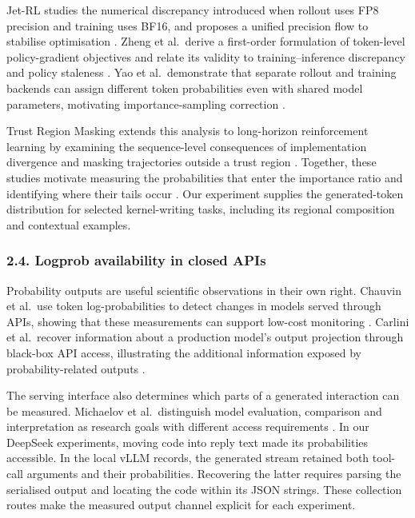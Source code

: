 \documentclass[
  11pt,
]{article}
\begin{document}
Jet-RL studies the numerical discrepancy introduced when rollout uses
FP8 precision and training uses BF16, and proposes a unified precision
flow to stabilise optimisation \citep{jetrl}. Zheng et al.~derive a
first-order formulation of token-level policy-gradient objectives and
relate its validity to training--inference discrepancy and policy
staleness \citep{firstorder}. Yao et al.~demonstrate that separate
rollout and training backends can assign different token probabilities
even with shared model parameters, motivating importance-sampling
correction \citep{liuoffpolicy}.

Trust Region Masking extends this analysis to long-horizon reinforcement
learning by examining the sequence-level consequences of implementation
divergence and masking trajectories outside a trust region
\citep{trustregion}. Together, these studies motivate measuring the
probabilities that enter the importance ratio and identifying where
their tails occur \citep{jetrl, firstorder, trustregion}. Our experiment
supplies the generated-token distribution for selected kernel-writing
tasks, including its regional composition and contextual examples.

\hypertarget{logprob-availability-in-closed-apis}{%
\subsubsection{2.4. Logprob availability in closed
APIs}\label{logprob-availability-in-closed-apis}}

Probability outputs are useful scientific observations in their own
right. Chauvin et al.~use token log-probabilities to detect changes in
models served through APIs, showing that these measurements can support
low-cost monitoring \citep{logprobtracking}. Carlini et al.~recover
information about a production model's output projection through
black-box API access, illustrating the additional information exposed by
probability-related outputs \citep{carlini}.

The serving interface also determines which parts of a generated
interaction can be measured. Michaelov et al.~distinguish model
evaluation, comparison and interpretation as research goals with
different access requirements \citep{howopen}. In our DeepSeek
experiments, moving code into reply text made its probabilities
accessible. In the local vLLM records, the generated stream retained
both tool-call arguments and their probabilities. Recovering the latter
requires parsing the serialised output and locating the code within its
JSON strings. These collection routes make the measured output channel
explicit for each experiment.
\end{document}

